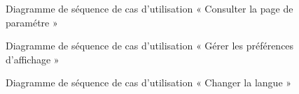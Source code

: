 \begin{figure}[H]
  \centering
  \caption{Diagramme de séquence de cas d'utilisation « Consulter la page de paramétre »}
  \label{fig:sequence_consult_settings_page}
\end{figure}

\begin{figure}[H]
  \centering
  \caption{Diagramme de séquence de cas d'utilisation « Gérer les préférences d'affichage »}
  \label{fig:sequence_preference_affichage}
\end{figure}


\begin{figure}[H]
  \centering
  \caption{Diagramme de séquence de cas d'utilisation « Changer la langue »}
  \label{fig:sequence_change_language}
\end{figure}

